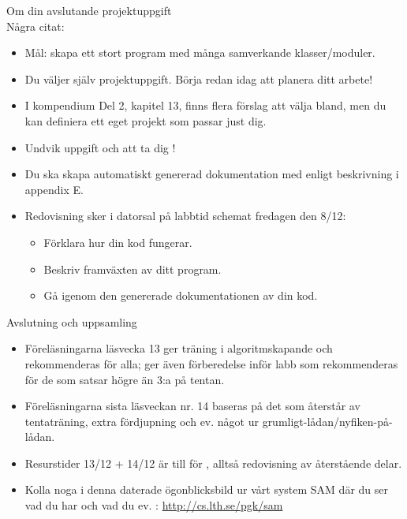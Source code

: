 




\begin{Slide}{Om din avslutande projektuppgift}\SlideFontSmall
{} \\
Några citat:
\begin{itemize}
\item Mål: skapa ett stort program med många samverkande klasser/moduler.
\item Du väljer själv projektuppgift. Börja redan idag att planera ditt arbete!
\item I kompendium Del 2, kapitel 13, finns flera förslag att välja bland, men du kan  definiera ett eget projekt som passar just dig.
\item Undvik  uppgift och att ta dig !
\item Du ska skapa automatiskt genererad dokumentation med  enligt beskrivning i appendix E.
\item Redovisning sker i datorsal på labbtid schemat fredagen den 8/12:
\begin{itemize}\SlideFontTiny
  \item Förklara hur din kod fungerar.
  \item Beskriv framväxten av ditt program.
  \item Gå igenom den genererade dokumentationen av din kod.
\end{itemize}
\end{itemize}

\end{Slide}


\begin{Slide}{Avslutning och uppsamling}
\begin{itemize}
\item Föreläsningarna läsvecka 13 ger träning i algoritmskapande och rekommenderas för alla; ger även förberedelse inför labb  som rekommenderas för de som satsar högre än 3:a på tentan.

\item Föreläsningarna sista läsveckan nr. 14 baseras på det som återstår av tentaträning, extra fördjupning och ev. något ur grumligt-lådan/nyfiken-på-lådan.

\item Resurstider 13/12 + 14/12 är till för , alltså redovisning av återstående delar.
\item Kolla noga i denna daterade ögonblicksbild ur vårt system SAM där du ser vad du har  och vad du ev. : \url{http://cs.lth.se/pgk/sam}
\end{itemize}
\end{Slide}


